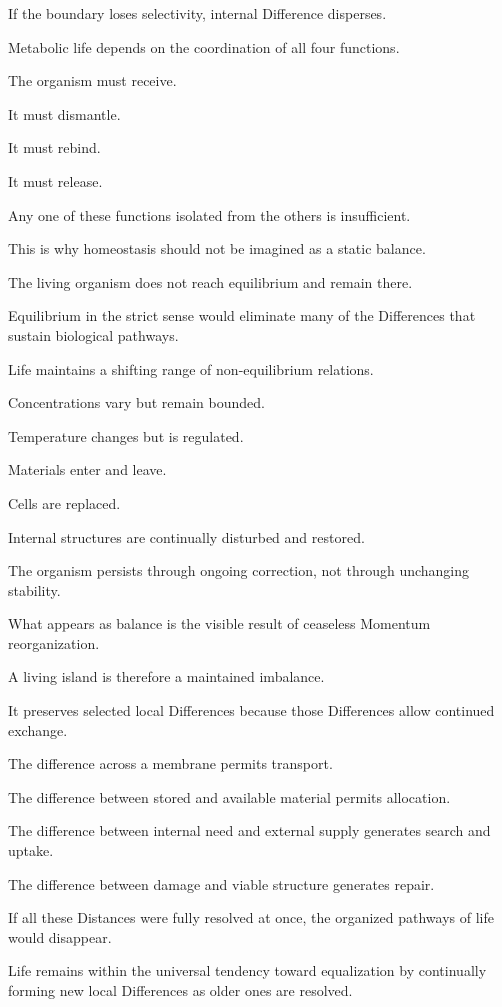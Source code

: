 If the boundary loses selectivity, internal Difference disperses.

Metabolic life depends on the coordination of all four functions.

The organism must receive.

It must dismantle.

It must rebind.

It must release.

Any one of these functions isolated from the others is insufficient.

This is why homeostasis should not be imagined as a static balance.

The living organism does not reach equilibrium and remain there.

Equilibrium in the strict sense would eliminate many of the Differences that sustain biological pathways.

Life maintains a shifting range of non-equilibrium relations.

Concentrations vary but remain bounded.

Temperature changes but is regulated.

Materials enter and leave.

Cells are replaced.

Internal structures are continually disturbed and restored.

The organism persists through ongoing correction, not through unchanging stability.

What appears as balance is the visible result of ceaseless Momentum reorganization.

A living island is therefore a maintained imbalance.

It preserves selected local Differences because those Differences allow continued exchange.

The difference across a membrane permits transport.

The difference between stored and available material permits allocation.

The difference between internal need and external supply generates search and uptake.

The difference between damage and viable structure generates repair.

If all these Distances were fully resolved at once, the organized pathways of life would disappear.

Life remains within the universal tendency toward equalization by continually forming new local Differences as older ones are resolved.

